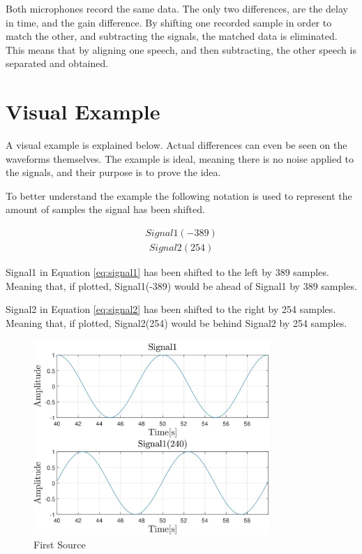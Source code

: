 Both microphones record the same data. The only two differences, are the delay in time,
and the gain difference. By shifting one recorded sample in order to match the other,
and subtracting the signals, the matched data is eliminated. This means that by aligning 
one speech, and then subtracting, the other speech is separated and obtained.

\newpage

\section{Visual Example}
A visual example is explained below. Actual differences can even be seen on the waveforms themselves.
The example is ideal, meaning there is no noise applied to the signals, and their purpose is to 
prove the idea.

To better understand the example the following notation is
used to represent the amount of samples the signal has been shifted. 

\begin{align}
	Signal1(-389)
	\label{eq:signal1}
\end{align}
\begin{align}
	Signal2(254)
	\label{eq:signal2}
\end{align}

Signal1 in Equation \ref{eq:signal1} has been shifted to the left by 389 samples. Meaning that, if 
plotted, Signal1(-389) would be ahead of Signal1 by 389 samples.

Signal2 in Equation \ref{eq:signal2} has been shifted to the right by 254 samples. Meaning that, if 
plotted, Signal2(254) would be behind Signal2 by 254 samples.

\begin{figure}[htp]
	\centering
	\includegraphics[width=0.8\textwidth]{Illustrations/source1.jpg}
	\caption{First Source}
	\label{fig:source1}
\end{figure}

